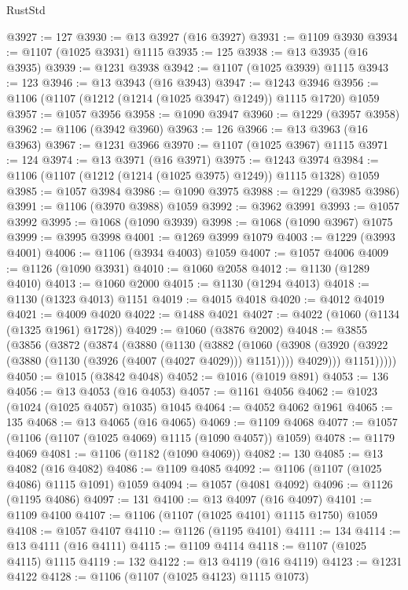 \begin{lexlean}{RustStd}
\begin{coremodule}
{\begin{coremodule}
{{{{{{{{{{{{{{{{{{{{{{{{{{{{{{{{{{{@3927 := 127
@3930 := @13 @3927 (@16 @3927)
@3931 := @1109 @3930
@3934 := @1107 (@1025 @3931) @1115
@3935 := 125
@3938 := @13 @3935 (@16 @3935)
@3939 := @1231 @3938
@3942 := @1107 (@1025 @3939) @1115
@3943 := 123
@3946 := @13 @3943 (@16 @3943)
@3947 := @1243 @3946
@3956 := @1106 (@1107 (@1212 (@1214 (@1025 @3947) @1249)) @1115 @1720) @1059
@3957 := @1057 @3956
@3958 := @1090 @3947
@3960 := @1229 (@3957 @3958)
@3962 := @1106 (@3942 @3960)
@3963 := 126
@3966 := @13 @3963 (@16 @3963)
@3967 := @1231 @3966
@3970 := @1107 (@1025 @3967) @1115
@3971 := 124
@3974 := @13 @3971 (@16 @3971)
@3975 := @1243 @3974
@3984 := @1106 (@1107 (@1212 (@1214 (@1025 @3975) @1249)) @1115 @1328) @1059
@3985 := @1057 @3984
@3986 := @1090 @3975
@3988 := @1229 (@3985 @3986)
@3991 := @1106 (@3970 @3988) @1059
@3992 := @3962 @3991
@3993 := @1057 @3992
@3995 := @1068 (@1090 @3939)
@3998 := @1068 (@1090 @3967) @1075
@3999 := @3995 @3998
@4001 := @1269 @3999 @1079
@4003 := @1229 (@3993 @4001)
@4006 := @1106 (@3934 @4003) @1059
@4007 := @1057 @4006
@4009 := @1126 (@1090 @3931)
@4010 := @1060 @2058
@4012 := @1130 (@1289 @4010)
@4013 := @1060 @2000
@4015 := @1130 (@1294 @4013)
@4018 := @1130 (@1323 @4013) @1151
@4019 := @4015 @4018
@4020 := @4012 @4019
@4021 := @4009 @4020
@4022 := @1488 @4021
@4027 := @4022 (@1060 (@1134 (@1325 @1961) @1728))
@4029 := @1060 (@3876 @2002)
@4048 := @3855
    (@3856
      (@3872
        (@3874
          (@3880
            (@1130
              (@3882
                (@1060
                  (@3908
                    (@3920 (@3922 (@3880 (@1130 (@3926 (@4007 (@4027 @4029))) @1151))))
                    @4029)))
              @1151)))))
@4050 := @1015 (@3842 @4048)
@4052 := @1016 (@1019 @891)
@4053 := 136
@4056 := @13 @4053 (@16 @4053)
@4057 := @1161 @4056
@4062 := @1023 (@1024 (@1025 @4057) @1035) @1045
@4064 := @4052 @4062 @1961
@4065 := 135
@4068 := @13 @4065 (@16 @4065)
@4069 := @1109 @4068
@4077 := @1057 (@1106 (@1107 (@1025 @4069) @1115 (@1090 @4057)) @1059)
@4078 := @1179 @4069
@4081 := @1106 (@1182 (@1090 @4069))
@4082 := 130
@4085 := @13 @4082 (@16 @4082)
@4086 := @1109 @4085
@4092 := @1106 (@1107 (@1025 @4086) @1115 @1091) @1059
@4094 := @1057 (@4081 @4092)
@4096 := @1126 (@1195 @4086)
@4097 := 131
@4100 := @13 @4097 (@16 @4097)
@4101 := @1109 @4100
@4107 := @1106 (@1107 (@1025 @4101) @1115 @1750) @1059
@4108 := @1057 @4107
@4110 := @1126 (@1195 @4101)
@4111 := 134
@4114 := @13 @4111 (@16 @4111)
@4115 := @1109 @4114
@4118 := @1107 (@1025 @4115) @1115
@4119 := 132
@4122 := @13 @4119 (@16 @4119)
@4123 := @1231 @4122
@4128 := @1106 (@1107 (@1025 @4123) @1115 @1073)
}}}}}}}}}}}}}}}}}}}}}}}}}}}}}}}}}}}
\end{coremodule}}
\end{coremodule}
\end{lexlean}
